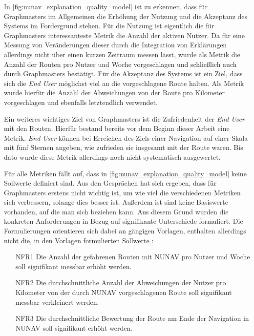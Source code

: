 In \autoref{fig:nunav_explanation_quality_model} ist zu erkennen, dass für Graphmasters im Allgemeinen die Erhöhung der Nutzung und die Akzeptanz des Systems im Fordergrund stehen. Für die Nutzung ist eigentlich die für Graphmasters interessanteste Metrik die Anzahl der aktiven Nutzer. Da für eine Messung von Veränderungen dieser durch die Integration von Erklärungen allerdings nicht über einen kurzen Zeitraum messen lässt, wurde  als Metrik die Anzahl der Routen pro Nutzer und Woche vorgeschlagen und schließlich auch durch Graphmasters bestätigt. Für die Akzeptanz des Systems ist ein Ziel, dass sich die \textit{End User} möglichst viel an die vorgeschlagene Route halten. Als Metrik wurde hierfür die Anzahl der Abweichungen von der Route pro Kilometer vorgeschlagen und ebenfalls letztendlich verwendet.

Ein weiteres wichtiges Ziel von Graphmasters ist die Zufriedenheit der \textit{End User} mit den Routen. Hierfür bestand bereits vor dem Beginn dieser Arbeit eine Metrik. \textit{End User} können bei Erreichen des Ziels einer Navigation auf einer Skala mit fünf Sternen angeben, wie zufrieden sie insgesamt mit der Route waren. Bis dato wurde diese Metrik allerdings noch nicht systematisch ausgewertet.

Für alle Metriken fällt auf, dass in \autoref{fig:nunav_explanation_quality_model} keine Sollwerte definiert sind. Aus den Gesprächen hat sich ergeben, dass für Graphmasters erstens nicht wichtig ist, um wie viel die verschiedenen Metriken sich verbessern, solange dies besser ist. Außerdem ist sind keine Basiswerte vorhanden, auf die man sich beziehen kann. Aus diesem Grund wurden die konkreten Anforderungen in Bezug auf signifikante Unterschiede formuliert. Die Formulierungen orientieren sich dabei an gängigen Vorlagen, enthalten allerdings nicht die, in den Vorlagen formulierten Sollwerte \cite{rajnish2010quality, wiegers1999writing, alexander2002writing}:

\begin{enumerate}
    \item [NFR1] Die Anzahl der gefahrenen Routen mit NUNAV pro Nutzer und Woche soll signifikant messbar erhöht werden.
    \item [NFR2] Die durchschnittliche Anzahl der Abweichungen der Nutzer pro Kilometer von der durch NUNAV vorgeschlagenen Route soll signifikant messbar verkleinert werden.
    \item [NFR3] Die durchschnittliche Bewertung der Route am Ende der Navigation in NUNAV soll signifikant erhöht werden.
\end{enumerate}

